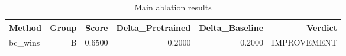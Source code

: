 \begin{table}[htbp]
\centering
\caption{Main ablation results}
\label{tab:main-results}
\begin{tabular}{lrrrrr}
\toprule
\textbf{Method} & \textbf{Group} & \textbf{Score} & \textbf{Delta\_Pretrained} & \textbf{Delta\_Baseline} & \textbf{Verdict} \\
\midrule
bc\_wins & B & 0.6500 & 0.2000 & 0.2000 & IMPROVEMENT \\
\bottomrule
\end{tabular}
\end{table}